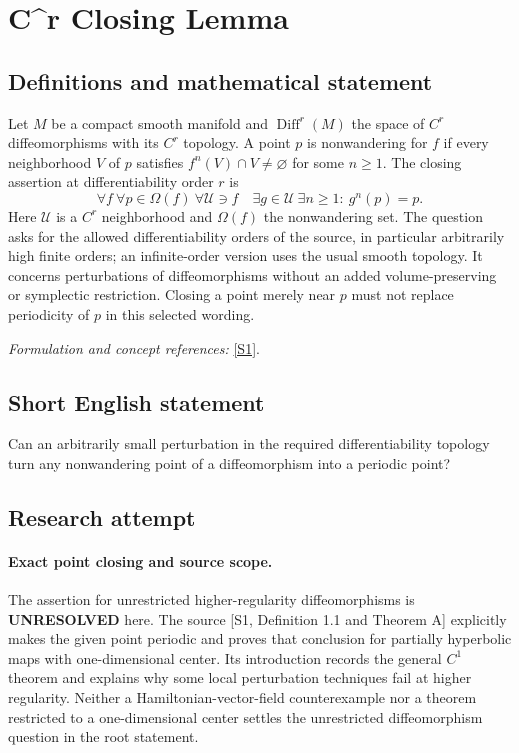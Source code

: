 \documentclass[11pt]{article}
\begin{document}
\section*{\texorpdfstring{C\textasciicircum{}r Closing Lemma}{C\textasciicircum{}r Closing Lemma}}\label{318}
\subsection{Definitions and mathematical statement}
Let $M$ be a compact smooth manifold and $\operatorname{Diff}^r(M)$ the space of $C^r$ diffeomorphisms with its $C^r$ topology. A point $p$ is nonwandering for $f$ if every neighborhood $V$ of $p$ satisfies $f^n(V)\cap V\ne\varnothing$ for some $n\ge1$. The closing assertion at differentiability order $r$ is
\[
 \forall f\ \forall p\in\Omega(f)\ \forall\mathcal U\ni f
 \quad\exists g\in\mathcal U\ \exists n\ge1:\ g^n(p)=p.
\]
Here $\mathcal U$ is a $C^r$ neighborhood and $\Omega(f)$ the nonwandering set. The question asks for the allowed differentiability orders of the source, in particular arbitrarily high finite orders; an infinite-order version uses the usual smooth topology. It concerns perturbations of diffeomorphisms without an added volume-preserving or symplectic restriction. Closing a point merely near $p$ must not replace periodicity of $p$ in this selected wording.
\par\smallskip\textit{Formulation and concept references:} \href{https://arxiv.org/html/2004.06855v2}{[S1]}.

\subsection{Short English statement}
Can an arbitrarily small perturbation in the required differentiability topology turn any nonwandering point of a diffeomorphism into a periodic point?
\subsection{Research attempt}
\paragraph{Exact point closing and source scope.}
The assertion for unrestricted higher-regularity diffeomorphisms
is \textbf{UNRESOLVED} here. The source [S1, Definition 1.1 and
Theorem A] explicitly makes the given point periodic and proves
that conclusion for partially hyperbolic maps with one-dimensional
center. Its introduction records the general $C^1$ theorem and
explains why some local perturbation techniques fail at higher
regularity. Neither a Hamiltonian-vector-field counterexample nor
a theorem restricted to a one-dimensional center settles the
unrestricted diffeomorphism question in the root statement.
\end{document}
